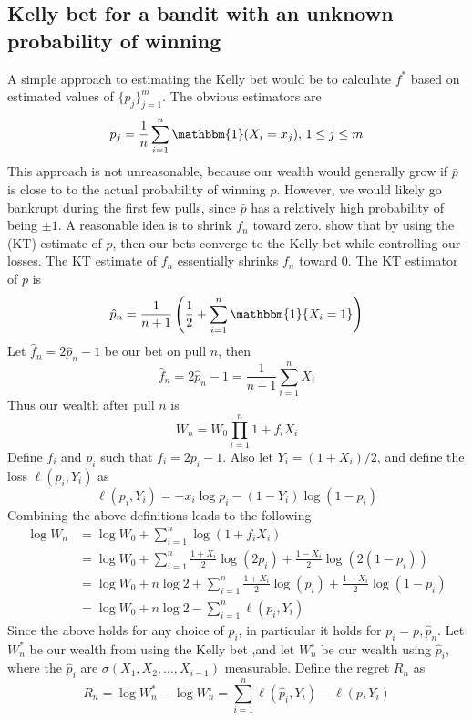 \documentclass[letterpaper]{article}
\numberwithin{equation}{section}
\theoremstyle{plain}
\begin{document}
\subsection{Kelly bet for a bandit with an unknown probability of winning}\label{kelly_unknown_prob}
A simple approach to estimating the Kelly bet would be to calculate $f^*$ based on estimated values of $\{p_j\}_{j=1}^m$. The obvious estimators are
\begin{equation*}
\bar{p}_j = \frac{1}{n} \sum_{i=1}^n \mathbbm{1}(X_i = x_j),\,1\le j\le m
\end{equation*}
This approach is not unreasonable, because our wealth would generally grow if $\bar{p}$ is close to to the actual probability of winning $p$. However, we would likely go bankrupt during the first few pulls, since $\bar{p}$ has a relatively high probability of being $\pm 1$. A reasonable idea is to shrink $f_n$ toward zero. \cite{orabona2016coin} show that by using the \cite{krichevsky1981performance} (KT) estimate of $p$, then our bets converge to the Kelly bet while controlling our losses. The KT estimate of $f_n$ essentially shrinks $f_n$ toward 0. The KT estimator of $p$ is
\begin{equation}
\hat{p}_n = \frac{1}{n+1}\left(\frac{1}{2} + \sum_{i=1}^n \mathbbm{1}\{X_i = 1\} \right)
\end{equation}
Let $\hat{f}_n=2\hat{p}_n-1$ be our bet on pull $n$, then
\begin{equation}
\hat{f}_n = 2\hat{p}_n-1 = \frac{1}{n+1}\sum_{i=1}^n X_i
\end{equation}
Thus our wealth after pull $n$ is
\begin{equation}
W_n = W_0\prod_{i=1}^n 1+f_i X_i
\end{equation}
Define $f_i$ and $p_i$ such that $f_i = 2p_i - 1$. Also let $Y_i = (1+X_i)/2$, and define the loss $\ell(p_i,Y_i)$ as
\begin{equation}\label{ell_loss}
\ell(p_i,Y_i) = -x_i\log p_i - (1-Y_i)\log(1-p_i)
\end{equation}
Combining the above definitions leads to the following
\begin{align}
\log W_n &= \log W_0 + \sum_{i=1}^n \log(1+f_i X_i)\\
&= \log W_0 + \sum_{i=1}^n \frac{1+X_i}{2} \log(2 p_i) + \frac{1-X_i}{2}\log(2(1-p_i))\\
&= \log W_0 + n\log 2 + \sum_{i=1}^n \frac{1+X_i}{2}\log(p_i) + \frac{1-X_i}{2}\log(1-p_i)\\
&= \log W_0 + n\log 2 - \sum_{i=1}^n \ell(p_i,Y_i)
\end{align}
Since the above holds for any choice of $p_i$, in particular it holds for $p_i=p,\hat{p}_n$. Let $W_n^*$ be our wealth from using the Kelly bet ,and let $W_n^\circ$ be our wealth using $\hat{p}_i$, where the $\hat{p}_i$ are $\sigma(X_1,X_2,\ldots,X_{i-1})$ measurable. Define the regret $R_n$ as
\begin{equation}
R_n = \log W_n^* - \log W_n^\circ = \sum_{i=1}^n \ell(\hat{p}_i,Y_i) - \ell(p,Y_i)
\end{equation}
\end{document}
